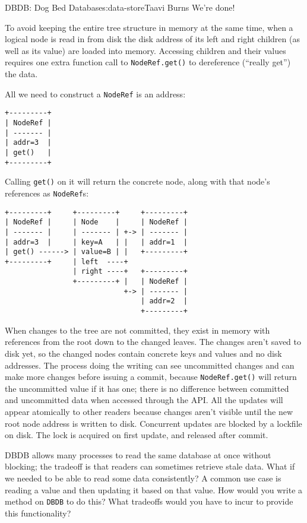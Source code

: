 \begin{aosachapter}{DBDB: Dog Bed Database}{s:data-store}{Taavi Burns}
We're done!

\label{how-noderefs-save-memory}

To avoid keeping the entire tree structure in memory at the same time,
when a logical node is read in from disk the disk address of its left
and right children (as well as its value) are loaded into memory.
Accessing children and their values requires one extra function call to
\texttt{NodeRef.get()} to dereference (``really get'') the data.

All we need to construct a \texttt{NodeRef} is an address:

\begin{verbatim}
+---------+
| NodeRef |
| ------- |
| addr=3  |
| get()   |
+---------+
\end{verbatim}

Calling \texttt{get()} on it will return the concrete node, along with
that node's references as \texttt{NodeRef}s:

\begin{verbatim}
+---------+     +---------+     +---------+
| NodeRef |     | Node    |     | NodeRef |
| ------- |     | ------- | +-> | ------- |
| addr=3  |     | key=A   | |   | addr=1  |
| get() ------> | value=B | |   +---------+
+---------+     | left  ----+
                | right ----+   +---------+
                +---------+ |   | NodeRef |
                            +-> | ------- |
                                | addr=2  |
                                +---------+
\end{verbatim}

When changes to the tree are not committed, they exist in memory with
references from the root down to the changed leaves. The changes aren't
saved to disk yet, so the changed nodes contain concrete keys and values
and no disk addresses. The process doing the writing can see uncommitted
changes and can make more changes before issuing a commit, because
\texttt{NodeRef.get()} will return the uncommitted value if it has one;
there is no difference between committed and uncommitted data when
accessed through the API. All the updates will appear atomically to
other readers because changes aren't visible until the new root node
address is written to disk. Concurrent updates are blocked by a lockfile
on disk. The lock is acquired on first update, and released after
commit.

\label{exercises-for-the-reader}

DBDB allows many processes to read the same database at once without
blocking; the tradeoff is that readers can sometimes retrieve stale
data. What if we needed to be able to read some data consistently? A
common use case is reading a value and then updating it based on that
value. How would you write a method on \texttt{DBDB} to do this? What
tradeoffs would you have to incur to provide this functionality?


\end{aosachapter}
